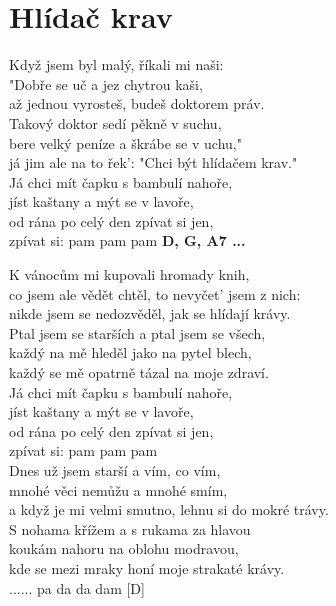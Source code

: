 \section{Hlídač krav}
\onehalfspacing

Když jsem byl malý, říkali mi naši: \\
"Dobře se uč a jez chytrou kaši, \\
až jednou vyrosteš, budeš doktorem práv. \\
Takový doktor sedí pěkně v suchu, \\
bere velký peníze a škrábe se v uchu," \\
já jim ale na to řek': "Chci být hlídačem krav."\\

Já chci mít čapku s bambulí nahoře, \\
jíst kaštany a mýt se v lavoře, \\
od rána po celý den zpívat si jen,\\
zpívat si: pam pam pam \textbf{D, G, A7 ...}\\


\singlespacing

\sloka{}
K vánocům mi kupovali hromady knih,\\
co jsem ale vědět chtěl, to nevyčet' jsem z nich:\\
nikde jsem se nedozvěděl, jak se hlídají krávy.\\
Ptal jsem se starších a ptal jsem se všech,\\
každý na mě hleděl jako na pytel blech,\\
každý se mě opatrně tázal na moje zdraví.\\

Já chci mít čapku s bambulí nahoře, \\
jíst kaštany a mýt se v lavoře, \\
od rána po celý den zpívat si jen,\\
zpívat si: pam pam pam \\


\sloka{}
Dnes už jsem starší a vím, co vím,\\
mnohé věci nemůžu a mnohé smím,\\
a když je mi velmi smutno, lehnu si do mokré trávy.\\
S nohama křížem a s rukama za hlavou\\
koukám nahoru na oblohu modravou,\\
kde se mezi mraky honí moje strakaté krávy.\\

 ...... pa da da dam [D]
